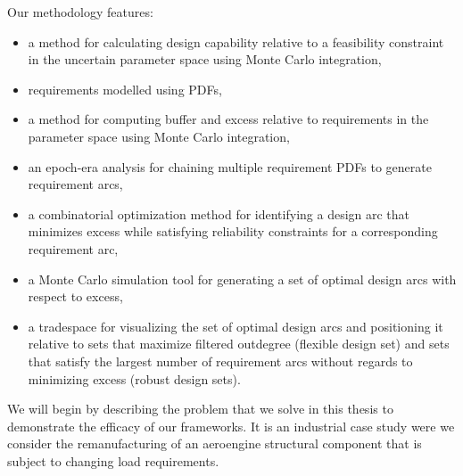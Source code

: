 Our methodology features:
\begin{itemize}
	\item a method for calculating design capability relative to a feasibility constraint in the uncertain parameter space using Monte Carlo integration,
	\item requirements modelled using \aclp{PDF},
	\item a method for computing buffer and excess relative to requirements in the parameter space using Monte Carlo integration,
	\item an epoch-era analysis for chaining multiple requirement \aclp{PDF} to generate requirement arcs,
	\item a combinatorial optimization method for identifying a design arc that minimizes excess while satisfying reliability constraints for a corresponding requirement arc,
	\item a Monte Carlo simulation tool for generating a set of optimal design arcs with respect to excess,
	\item a tradespace for visualizing the set of optimal design arcs and positioning it relative to sets that maximize filtered outdegree (flexible design set) and sets that satisfy the largest number of requirement arcs without regards to minimizing excess (robust design sets).
\end{itemize}

We will begin by describing the problem that we solve in this thesis to demonstrate the efficacy of our frameworks. It is an industrial case study were we consider the remanufacturing of an aeroengine structural component that is subject to changing load requirements.